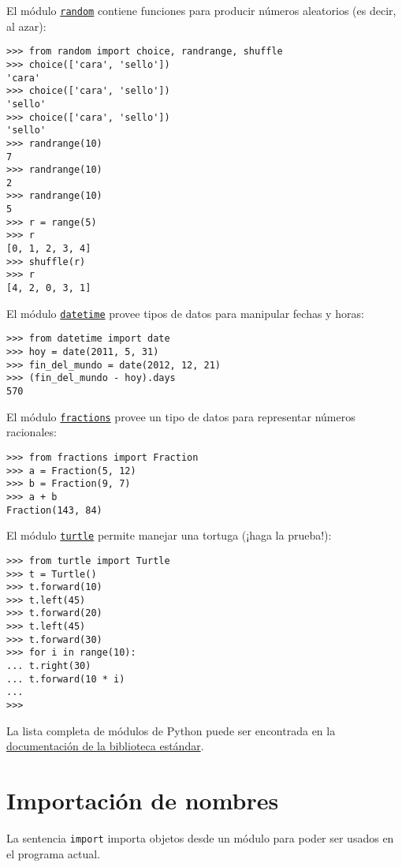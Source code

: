 El módulo \href{http://docs.python.org/library/random.html}{\lstinline!random!}
contiene funciones para producir números aleatorios (es decir, al azar):

\begin{lstlisting}
>>> from random import choice, randrange, shuffle
>>> choice(['cara', 'sello'])
'cara'
>>> choice(['cara', 'sello'])
'sello'
>>> choice(['cara', 'sello'])
'sello'
>>> randrange(10)
7
>>> randrange(10)
2
>>> randrange(10)
5
>>> r = range(5)
>>> r
[0, 1, 2, 3, 4]
>>> shuffle(r)
>>> r
[4, 2, 0, 3, 1]
\end{lstlisting}

El módulo \href{http://docs.python.org/library/datetime.html}{\lstinline!datetime!}
provee tipos de datos para manipular fechas y horas:

\begin{lstlisting}
>>> from datetime import date
>>> hoy = date(2011, 5, 31)
>>> fin_del_mundo = date(2012, 12, 21)
>>> (fin_del_mundo - hoy).days
570
\end{lstlisting}

El módulo
\href{http://docs.python.org/library/fractions.html}{\lstinline!fractions!} provee
un tipo de datos para representar números racionales:

\begin{lstlisting}
>>> from fractions import Fraction
>>> a = Fraction(5, 12)
>>> b = Fraction(9, 7)
>>> a + b
Fraction(143, 84)
\end{lstlisting}

El módulo \href{http://docs.python.org/library/turtle.html}{\lstinline!turtle!}
permite manejar una tortuga (¡haga la prueba!):

\begin{lstlisting}
>>> from turtle import Turtle
>>> t = Turtle()
>>> t.forward(10)
>>> t.left(45)
>>> t.forward(20)
>>> t.left(45)
>>> t.forward(30)
>>> for i in range(10):
... t.right(30)
... t.forward(10 * i)
...
>>>
\end{lstlisting}

La lista completa de módulos de Python puede ser encontrada en la
\href{http://docs.python.org/library/index.html}{documentación de la
biblioteca estándar}.

\section{Importación de nombres}

La sentencia \lstinline!import! importa objetos desde un módulo para
poder ser usados en el programa actual.

